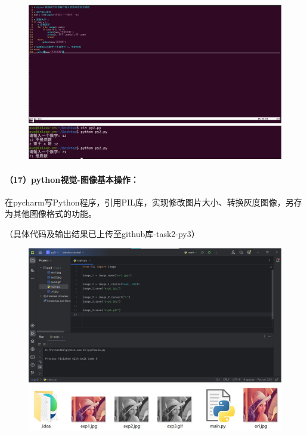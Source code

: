 \documentclass[a4paper, 12pt]{article}
\begin{document}
	\begin{figure}[H]
		\centering
		\includegraphics[width=1\textwidth]{031.jpg}
		\includegraphics[width=1\textwidth]{032.jpg}
	\end{figure}
	
	\paragraph{（17）python视觉-图像基本操作：}
	在pycharm写Python程序，引用PIL库，实现修改图片大小、转换灰度图像，另存为其他图像格式的功能。
	
	（具体代码及输出结果已上传至github库-task2-py3）
	
	\begin{figure}[H]
		\centering
		\includegraphics[width=1\textwidth]{033.jpg}
		\includegraphics[width=1\textwidth]{034.jpg}
	\end{figure}
	
\end{document}
